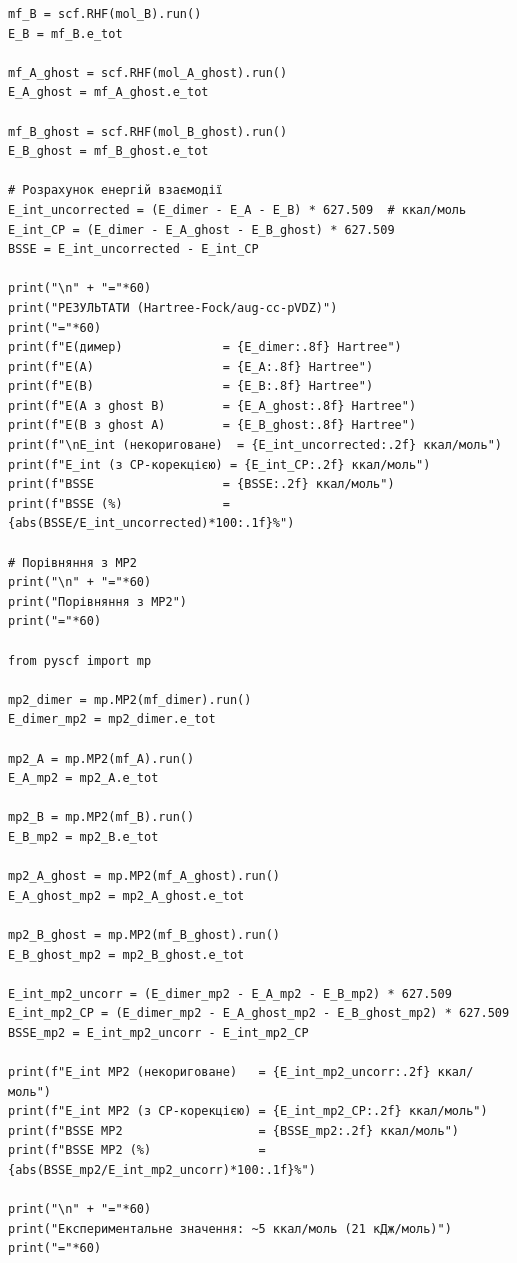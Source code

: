 \begin{verbatim}
mf_B = scf.RHF(mol_B).run()
E_B = mf_B.e_tot

mf_A_ghost = scf.RHF(mol_A_ghost).run()
E_A_ghost = mf_A_ghost.e_tot

mf_B_ghost = scf.RHF(mol_B_ghost).run()
E_B_ghost = mf_B_ghost.e_tot

# Розрахунок енергій взаємодії
E_int_uncorrected = (E_dimer - E_A - E_B) * 627.509  # ккал/моль
E_int_CP = (E_dimer - E_A_ghost - E_B_ghost) * 627.509
BSSE = E_int_uncorrected - E_int_CP

print("\n" + "="*60)
print("РЕЗУЛЬТАТИ (Hartree-Fock/aug-cc-pVDZ)")
print("="*60)
print(f"E(димер)              = {E_dimer:.8f} Hartree")
print(f"E(A)                  = {E_A:.8f} Hartree")
print(f"E(B)                  = {E_B:.8f} Hartree")
print(f"E(A з ghost B)        = {E_A_ghost:.8f} Hartree")
print(f"E(B з ghost A)        = {E_B_ghost:.8f} Hartree")
print(f"\nE_int (некориговане)  = {E_int_uncorrected:.2f} ккал/моль")
print(f"E_int (з CP-корекцією) = {E_int_CP:.2f} ккал/моль")
print(f"BSSE                  = {BSSE:.2f} ккал/моль")
print(f"BSSE (%)              = {abs(BSSE/E_int_uncorrected)*100:.1f}%")

# Порівняння з MP2
print("\n" + "="*60)
print("Порівняння з MP2")
print("="*60)

from pyscf import mp

mp2_dimer = mp.MP2(mf_dimer).run()
E_dimer_mp2 = mp2_dimer.e_tot

mp2_A = mp.MP2(mf_A).run()
E_A_mp2 = mp2_A.e_tot

mp2_B = mp.MP2(mf_B).run()
E_B_mp2 = mp2_B.e_tot

mp2_A_ghost = mp.MP2(mf_A_ghost).run()
E_A_ghost_mp2 = mp2_A_ghost.e_tot

mp2_B_ghost = mp.MP2(mf_B_ghost).run()
E_B_ghost_mp2 = mp2_B_ghost.e_tot

E_int_mp2_uncorr = (E_dimer_mp2 - E_A_mp2 - E_B_mp2) * 627.509
E_int_mp2_CP = (E_dimer_mp2 - E_A_ghost_mp2 - E_B_ghost_mp2) * 627.509
BSSE_mp2 = E_int_mp2_uncorr - E_int_mp2_CP

print(f"E_int MP2 (некориговане)   = {E_int_mp2_uncorr:.2f} ккал/моль")
print(f"E_int MP2 (з CP-корекцією) = {E_int_mp2_CP:.2f} ккал/моль")
print(f"BSSE MP2                   = {BSSE_mp2:.2f} ккал/моль")
print(f"BSSE MP2 (%)               = {abs(BSSE_mp2/E_int_mp2_uncorr)*100:.1f}%")

print("\n" + "="*60)
print("Експериментальне значення: ~5 ккал/моль (21 кДж/моль)")
print("="*60)
\end{verbatim}


